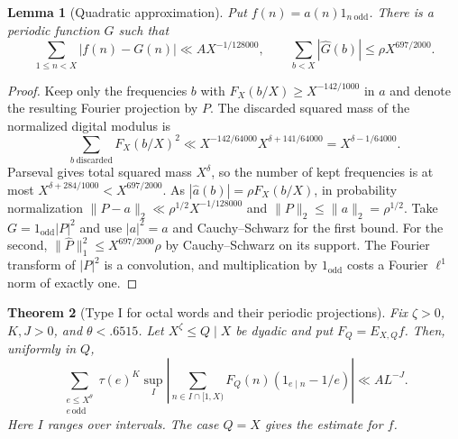 \documentclass[11pt,a4paper]{article}
\theoremstyle{paperplain}
\newtheorem{theorem}{Theorem}[section]
\newtheorem{lemma}[theorem]{Lemma}
\numberwithin{equation}{section}
\newcommand{\e}{\mathrm e}
\begin{document}
\begin{lemma}[Quadratic approximation]\label{octal:quad-approx}
Put $f(n)=a(n)1_{n\ \mathrm{odd}}$. There is a periodic function $G$ such that
\[
 \sum_{1\le n<X}|f(n)-G(n)|\ll A X^{-1/128000},\qquad
 \sum_{b<X}|\widehat G(b)|\le \rho X^{697/2000}.
\]
\end{lemma}
\begin{proof}
Keep only the frequencies $b$ with $F_X(b/X)\ge X^{-142/1000}$ in
$a$ and denote the resulting Fourier projection by $P$.
The discarded squared mass of the normalized digital modulus is
\[
 \sum_{b\ \mathrm{discarded}} F_X(b/X)^2
 \ll X^{-142/64000}X^{\delta+141/64000}=X^{\delta-1/64000}.
\]
Parseval gives total squared mass $X^\delta$, so the number of kept
frequencies is at most $X^{\delta+284/1000}<X^{697/2000}$.
As $|\widehat a(b)|=\rho F_X(b/X)$, in probability normalization
$\|P-a\|_2\ll\rho^{1/2}X^{-1/128000}$ and $\|P\|_2\le\|a\|_2=\rho^{1/2}$.
Take $G=1_{\mathrm{odd}}|P|^2$ and use $|a|^2=a$ and Cauchy--Schwarz for
the first bound. For the second, $\|\widehat P\|_1^2\le X^{697/2000}\rho$
by Cauchy--Schwarz on its support. The Fourier transform of $|P|^2$
is a convolution, and multiplication by $1_{\mathrm{odd}}$ costs a
Fourier $\ell^1$ norm of exactly one.
\end{proof}

\begin{theorem}[Type I for octal words and their periodic projections]
\label{octal:lifted-odd-divisor-marks}\label{octal:strong-typeI}
Fix $\zeta>0$, $K,J>0$, and $\theta<.6515$.
Let $X^\zeta\le Q\mid X$ be dyadic and put $F_Q=E_{X,Q}f$.
Then, uniformly in $Q$,
\[
 \sum_{\substack{e\le X^\theta\\e\,\mathrm{odd}}}\tau(e)^K
    \sup_I\left|\sum_{n\in I\cap[1,X)} F_Q(n)
                       (1_{e\mid n}-1/e)\right|\ll A L^{-J}.
\]
Here $I$ ranges over intervals. The case $Q=X$ gives the estimate for $f$.
\end{theorem}
\end{document}
